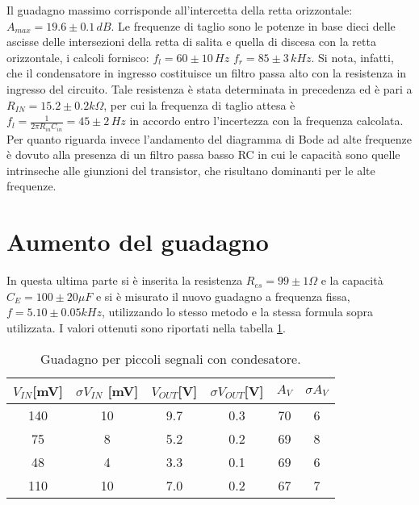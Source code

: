 \documentclass[10pt,a4paper]{article}
\begin{document}
Il guadagno massimo corrisponde all'intercetta della retta orizzontale: $A_{max}=19.6  \pm 0.1\, dB$. Le frequenze di taglio sono le potenze in base dieci delle ascisse delle intersezioni della retta di salita e quella di discesa con la retta orizzontale, i calcoli fornisco: $f_l=60\pm10 \, Hz$ $f_r=85 \pm 3\, kHz$. Si nota, infatti, che il condensatore in ingresso costituisce un filtro passa alto con la resistenza in ingresso del circuito. Tale resistenza è stata determinata in precedenza ed è pari a $R_{IN} = 15.2 \pm 0.2 k \Omega$, per cui la frequenza di taglio attesa è $f_l = \frac{1}{2 \pi R_{in}C_{in}}=45 \pm 2\, Hz$ in  accordo entro l'incertezza con la frequenza calcolata. Per quanto riguarda  invece l'andamento del diagramma di Bode ad alte frequenze è dovuto alla presenza di un filtro passa basso RC in cui le capacità sono quelle intrinseche alle giunzioni del transistor, che risultano dominanti per le alte frequenze.


\section{Aumento del guadagno}
In questa ultima parte si è inserita la resistenza $R_{es}= 99\pm 1 \Omega$ e la capacità $C_E= 100\pm20  \mu F$ e si è misurato il nuovo guadagno a frequenza fissa, $f=5.10 \pm0.05 kHz$, utilizzando lo stesso metodo e la stessa formula sopra utilizzata. I valori ottenuti sono riportati nella tabella \ref{guadpic}.

\begin{table}[h]
\centering
\begin{tabular}{|c|c|c|c|c|c|}
\hline 
$V_{IN}$[mV] & $\sigma V_{IN}$ [mV] & $V_{OUT}$[V] & $\sigma V_{OUT}$[V] & $A_V$ & $\sigma A_V$ \\ 
\hline
140 & 10 & 9.7 & 0.3 & 70 & 6\\
75 & 8 & 5.2 & 0.2 & 69 & 8\\
48 & 4 & 3.3 & 0.1 & 69 & 6\\
110 & 10 & 7.0 & 0.2 & 67 & 7\\
\hline
\end{tabular}
\caption{Guadagno per piccoli segnali con condesatore.}
\label{guadpic}
\end{table}
\end{document}
